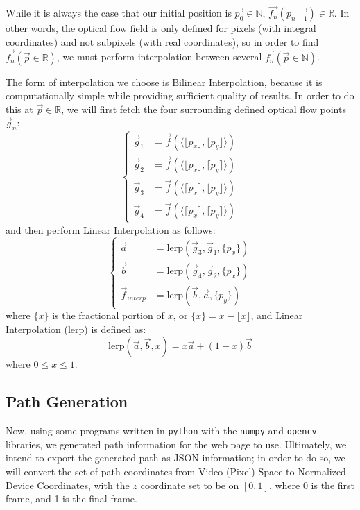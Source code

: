While it is always the case that our initial position is $\vec{p_0} \in \mathbb{N}$, $\vec{f_n}(\vec{p_{n-1}}) \in \mathbb{R}$. In other words, the optical flow field is only defined for pixels (with integral coordinates) and not subpixels (with real coordinates), so in order to find $\vec{f_n}(\vec{p} \in \mathbb{R})$, we must perform interpolation between several $\vec{f_n}(\vec{p} \in \mathbb{N})$.
\par The form of interpolation we choose is Bilinear Interpolation, because it is computationally simple while providing sufficient quality of results. In order to do this at $\vec{p} \in \mathbb{R}$, we will first fetch the four surrounding defined optical flow points $\vec{g}_n$:
\begin{equation}
\begin{cases}
    \vec{g}_1 & = \vec{f}(\langle \lfloor p_x \rfloor, \lfloor p_y \rfloor \rangle) \\
    \vec{g}_2 & = \vec{f}(\langle \lfloor p_x \rfloor, \lceil p_y \rceil \rangle) \\
    \vec{g}_3 & = \vec{f}(\langle \lceil p_x \rceil, \lfloor p_y \rfloor \rangle) \\
    \vec{g}_4 & = \vec{f}(\langle \lceil p_x \rceil, \lceil p_y \rceil \rangle)
\end{cases}
\end{equation}
and then perform Linear Interpolation as follows:
\begin{equation}
\begin{cases}
    \vec{a} & = \text{lerp} (\vec{g}_3, \vec{g}_1, \{p_x\}) \\
    \vec{b} & = \text{lerp} (\vec{g}_4, \vec{g}_2, \{p_x\}) \\
    \vec{f}_{interp} & = \text{lerp} (\vec{b}, \vec{a}, \{p_y\})
\end{cases}
\end{equation}
where $\{x\}$ is the fractional portion of $x$, or $\{x\} = x - \lfloor x \rfloor$, and Linear Interpolation (lerp) is defined as:
\begin{equation}
    \text{lerp}(\vec{a}, \vec{b}, x) = x\vec{a} + (1-x)\vec{b}
\end{equation}
where $0 \leq x \leq 1$.

\subsection{Path Generation}
Now, using some programs  written in \texttt{python} with the \texttt{numpy} and \texttt{opencv} libraries, we generated path information for the web page to use. Ultimately, we intend to export the generated path as JSON information; in order to do so, we will convert the set of path coordinates from Video (Pixel) Space to Normalized Device Coordinates, with the $z$ coordinate set to be on $[0,1]$, where 0 is the first frame, and 1 is the final frame.

